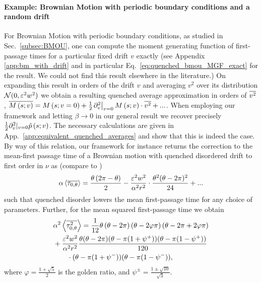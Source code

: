 \documentclass[%
 reprint,
superscriptaddress,
nofootinbib,
 amsmath,amssymb,
 aps,
prx,
]{revtex4-2}
\begin{document}
 \paragraph*{Example: Brownian Motion with periodic boundary conditions and a random drift}
 For Brownian Motion with periodic boundary conditions, as studied in Sec.~\ref{subsec:BMOU}, one can compute the moment generating function of first-passage times for a particular fixed drift $v$ exactly (see Appendix \ref{app:bm_with_drift} and in particular Eq.~\eqref{eq:quenched_bmou_MGF_exact} for the result. We could not find this result elsewhere in the literature.) On expanding this result in orders of the drift $v$ and averaging $v^2$ over its distribution $\mathcal{N}(0,\varepsilon^2 w^2)$ we obtain a resulting quenched average approximation in orders of $\overline{v^2}$, ${\overline{M\left(s;v\right)}} = {{M\left(s;v=0\right)}} + \frac12 {{\left. \partial_v^2 \right|_{v=0}M\left(s;v\right)}}\cdot \overline{v^2} + ...$.
 When employing our framework and letting $\beta \to 0$ in our general result  we recover precisely $\frac12 {{\partial_v^2 |_{v=0} \hat{p}\left(s;v\right)}}$. The necessary calculations are given in App.~\ref{app:equivalent_quenched_averages} and show that this is indeed the case. By way of this relation, our framework for instance returns the correction to the mean-first passage time of a Brownian motion with quenched disordered drift to first order in $\nu$ as (compare to )
 \begin{align}
     \alpha \left\langle {\overline{\tau_{0,\theta}}} \right\rangle = \frac{\theta \left( 2\pi -\theta \right)}{2} - \frac{\varepsilon^2 w^2}{\alpha^2 r^2 }\cdot \frac{\theta ^2 (\theta -2 \pi )^2}{24 } + ...
     \end{align}
     such that quenched disorder lowers the mean first-passage time for any choice of parameters. Further, for the mean squared first-passage time we obtain
     \begin{align}
    & \alpha^2 \left\langle {\overline{\tau_{0,\theta}^{2}}} \right\rangle =\frac{1}{12} \theta \left(\theta-2\pi\right)\left( \theta - 2\varphi \pi\right) \left( \theta - 2\pi + 2\varphi \pi\right) \nonumber \\
         &+\frac{\varepsilon^2 w^2}{\alpha^2 r^2 }\frac{\theta(\theta-2\pi)(\theta-\pi(1+\psi^+))(\theta-\pi(1-\psi^+))}{120} \nonumber \\
         &\qquad \cdot (\theta-\pi(1+\psi^-))(\theta-\pi(1-\psi^-)),
     \end{align}
     where $\varphi = \frac{1+\sqrt{5}}{2}$ is the golden ratio, and $\psi^{\pm}= \frac{1\pm\sqrt{10}}{\sqrt{3}}$.
\end{document}
